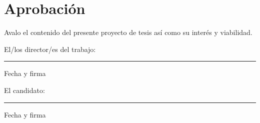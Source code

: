 \section*{Aprobación}
\label{sec:firmas}

Avalo el contenido del presente proyecto de tesis así como su interés y
viabilidad.

\vspace{2cm}
\noindent
\begin{minipage}[t]{0.45\textwidth}
  \centering
  El/los director/es del trabajo:

  \vspace{2.5cm}
  \rule{6cm}{0.4pt}\par
  Fecha y firma
\end{minipage}%
\hfill
\begin{minipage}[t]{0.45\textwidth}
  \centering
  El candidato:

  \vspace{2.5cm}
  \rule{6cm}{0.4pt}\par
  Fecha y firma
\end{minipage}
